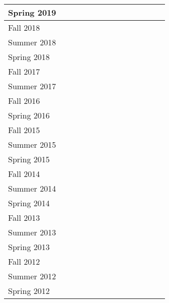 \documentclass[11pt]{letter}
\newcommand{\ck}{\checkmark}
\begin{document}
\begin{tabular}{|l|c|c|c|c|c|c|c|c|c|c|c|c|c|}
  Spring 2019 &    &    &    &    &    &\ck &    &    &    &\ck &\ck &    &    \\ \hline
  Fall   2018 &\ck &    &    &    &\ck &\ck &    &    &    &    &    &    &    \\ \hline
  Summer 2018 &    &    &    &    &    &\ck &    &    &    &    &    &    &    \\ \hline
  Spring 2018 &    &    &    &    &    &\ck &    &    &    &\ck &    &    &    \\ \hline
  Fall   2017 &    &    &    &    &\ck &\ck &    &    &    &    &    &    &    \\ \hline
  Summer 2017 &    &    &    &    &    &    &    &\ck &    &    &    &    &    \\ \hline
  Fall   2016 &    &\ck &    &    &    &    &\ck &    &    &    &    &    &    \\ \hline
  Spring 2016 &    &\ck &    &    &    &    &    &    &    &\ck &    &    &    \\ \hline
  Fall   2015 &    &\ck &    &    &    &    &\ck &    &    &    &    &    &    \\ \hline
  Summer 2015 &    &    &    &    &    &\ck &    &    &    &    &    &    &    \\ \hline
  Spring 2015 &    &    &\ck &    &    &\ck &    &    &    &    &    &    &    \\ \hline
  Fall   2014 &    &    &    &    &    &\ck &\ck &    &    &    &    &    &    \\ \hline
  Summer 2014 &    &    &    &    &    &\ck &    &    &    &    &    &    &    \\ \hline
  Spring 2014 &    &    &    &    &    &\ck &    &    &    &    &    &    &    \\ \hline
  Fall   2013 &    &\ck &    &    &    &    &    &    &\ck &    &    &    &    \\ \hline
  Summer 2013 &    &    &    &    &    &\ck &    &    &    &    &    &    &    \\ \hline
  Spring 2013 &    &\ck &    &    &    &\ck &    &    &    &    &    &    &    \\ \hline
  Fall   2012 &\ck &    &    &    &    &    &    &    &    &    &    &    &    \\ \hline
  Summer 2012 &    &    &    &    &    &\ck &    &\ck &    &    &    &    &    \\ \hline
  Spring 2012 &\ck &    &    &    &    &\ck &\ck &    &    &    &    &    &    \\ \hline

\end{tabular}
\end{document}
